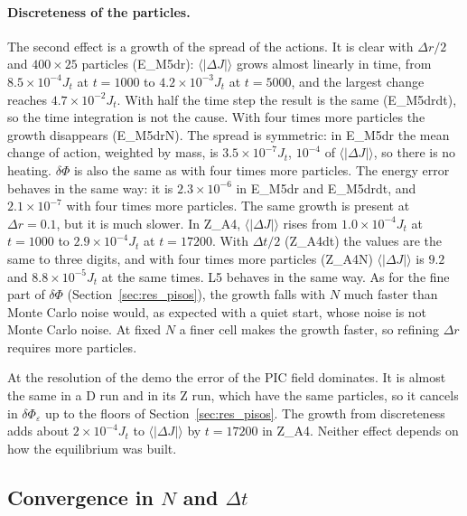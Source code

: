 \documentclass[11pt,a4paper]{article}
\begin{document}
\paragraph{Discreteness of the particles.} The second effect is a growth of the spread of
the actions. It is clear with $\Delta r/2$ and $400\times25$ particles (E\_M5dr):
$\langle|\Delta J|\rangle$ grows almost linearly in time, from $8.5\times10^{-4}J_t$ at $t=1000$ to
$4.2\times10^{-3}J_t$ at $t=5000$, and the largest change reaches $4.7\times10^{-2}J_t$. With half the
time step the result is the same (E\_M5drdt), so the time integration is not the cause.
With four times more particles the growth disappears (E\_M5drN). The spread is symmetric:
in E\_M5dr the mean change of action, weighted by mass, is $3.5\times10^{-7}J_t$, $10^{-4}$ of
$\langle|\Delta J|\rangle$, so there is no heating. $\delta\Phi$ is also the same as with four
times more particles. The energy error behaves in the same way: it is $2.3\times10^{-6}$ in E\_M5dr
and E\_M5drdt, and $2.1\times10^{-7}$ with four times more particles. The same growth is present
at $\Delta r=0.1$, but it is much slower. In Z\_A4, $\langle|\Delta J|\rangle$ rises from
$1.0\times10^{-4}J_t$ at $t=1000$ to $2.9\times10^{-4}J_t$ at $t=17200$. With $\Delta t/2$ (Z\_A4dt)
the values are the same to three digits, and with four times more particles (Z\_A4N)
$\langle|\Delta J|\rangle$ is $9.2$ and $8.8\times10^{-5}J_t$ at the same times. L5 behaves in the
same way. As for the fine part of $\delta\Phi$ (Section~\ref{sec:res_pisos}), the growth falls
with $N$ much faster than Monte Carlo noise would, as expected with a quiet start, whose
noise is not Monte Carlo noise. At fixed $N$ a finer cell makes the growth faster, so
refining $\Delta r$ requires more particles.

At the resolution of the demo the error of the PIC field dominates. It is almost the same in
a D run and in its Z run, which have the same particles, so it cancels in
$\delta\Phi_\varepsilon$ up to the floors of Section~\ref{sec:res_pisos}. The growth from
discreteness adds about $2\times10^{-4}J_t$ to $\langle|\Delta J|\rangle$ by $t=17200$ in Z\_A4.
Neither effect depends on how the equilibrium was built.

\subsection{Convergence in \texorpdfstring{$N$}{N} and \texorpdfstring{$\Delta t$}{dt}}
\label{sec:convergencia}
\end{document}
